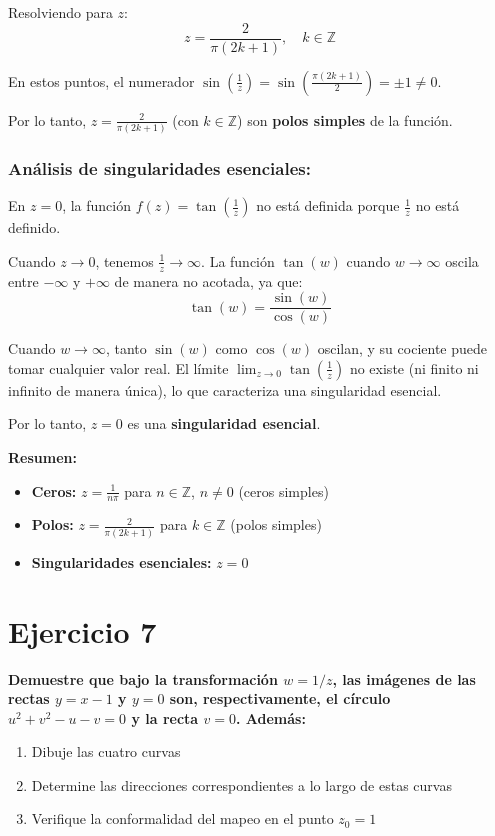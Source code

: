 \documentclass{article}
\begin{document}
Resolviendo para $z$:
$$z = \frac{2}{\pi(2k + 1)}, \quad k \in \mathbb{Z}$$

En estos puntos, el numerador $\sin\left(\frac{1}{z}\right) = \sin\left(\frac{\pi(2k + 1)}{2}\right) = \pm 1 \neq 0$.

Por lo tanto, $z = \frac{2}{\pi(2k + 1)}$ (con $k \in \mathbb{Z}$) son \textbf{polos simples} de la función.

\subsubsection*{Análisis de singularidades esenciales:}

En $z = 0$, la función $f(z) = \tan\left(\frac{1}{z}\right)$ no está definida porque $\frac{1}{z}$ no está definido.

Cuando $z \to 0$, tenemos $\frac{1}{z} \to \infty$. La función $\tan(w)$ cuando $w \to \infty$ oscila entre $-\infty$ y $+\infty$ de manera no acotada, ya que:
$$\tan(w) = \frac{\sin(w)}{\cos(w)}$$

Cuando $w \to \infty$, tanto $\sin(w)$ como $\cos(w)$ oscilan, y su cociente puede tomar cualquier valor real. El límite $\lim_{z \to 0} \tan\left(\frac{1}{z}\right)$ no existe (ni finito ni infinito de manera única), lo que caracteriza una singularidad esencial.

Por lo tanto, $z = 0$ es una \textbf{singularidad esencial}.

\textbf{Resumen:}
\begin{itemize}
\item \textbf{Ceros:} $z = \frac{1}{n\pi}$ para $n \in \mathbb{Z}$, $n \neq 0$ (ceros simples)
\item \textbf{Polos:} $z = \frac{2}{\pi(2k + 1)}$ para $k \in \mathbb{Z}$ (polos simples)
\item \textbf{Singularidades esenciales:} $z = 0$
\end{itemize}

\newpage
\section*{Ejercicio 7}

\textbf{Demuestre que bajo la transformación $w = 1/z$, las imágenes de las rectas $y = x - 1$ y $y = 0$ son, respectivamente, el círculo $u^2 + v^2 - u - v = 0$ y la recta $v = 0$. Además:}
\begin{enumerate}
\item Dibuje las cuatro curvas
\item Determine las direcciones correspondientes a lo largo de estas curvas
\item Verifique la conformalidad del mapeo en el punto $z_0 = 1$
\end{enumerate}
\end{document}

